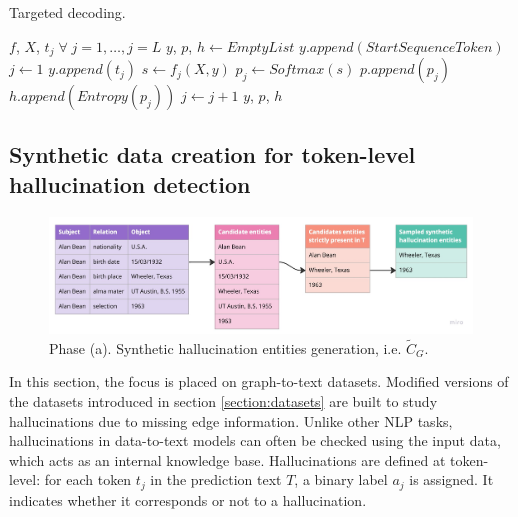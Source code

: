 \begin{algorithm}
\caption{Targeted decoding.}\label{alg:targeted-decoding}
\begin{algorithmic}

\Require $f$, $X$,  $t_j \;\forall \; j=1, \ldots, j=L$   
\State $y$, $p$, $h \gets EmptyList$
\State $y.append(StartSequenceToken)$
\State $j \gets 1$
    \State $y.append(t_j)$  
    \State $s \gets f_j(X, y)$  
    \State $p_j \gets Softmax(s)$
    \State $p.append(p_j)$
    \State $h.append(Entropy(p_j))$ 
    \State $j \gets j + 1$
\EndWhile
\State \Return $y$, $p$, $h$
\end{algorithmic}
\end{algorithm}


\subsection{Synthetic data creation for token-level hallucination detection} \label{design:synthetic-hallucination-data}


\begin{figure}[t]
    \centering
    \includegraphics[scale=0.23]{figures/design/synthetic/hallu_ents_selection.jpg}
    \caption{Phase (a). Synthetic hallucination entities generation, i.e. $\tilde{C}_G$.}
    \label{fig:synthetic-ents-selection}
\end{figure}

In this section, the focus is placed on graph-to-text datasets. Modified versions of the datasets introduced in section \ref{section:datasets} are built to study hallucinations due to missing edge information. Unlike other NLP tasks, hallucinations in data-to-text models can often be checked using the input data, which acts as an internal knowledge base. Hallucinations are defined at token-level: for each token $t_j$ in the prediction text $T$, a binary label $a_j$ is assigned. It indicates whether it corresponds or not to a hallucination. 

